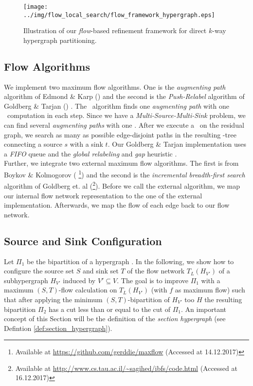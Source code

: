 \begin{figure}
\centering 
\texttt{[image: ../img/flow\_local\_search/flow\_framework\_hypergraph.eps]}
\caption{Illustration of our \emph{flow}-based refinement framework for direct $k$-way hypergraph
         partitioning.}
\label{img:flow_framework}
\end{figure} 

\subsection{Flow Algorithms}
\label{sec:flow_algo_implementation}

We implement two maximum flow algorithms.
One is the \emph{augmenting path} algorithm of Edmond \& Karp (\EdmondKarp)
\cite{edmonds1972theoretical} 
and the second is the \emph{Push-Relabel} algorithm of
Goldberg \& Tarjan (\GoldbergTarjan) \cite{cherkassky1997implementing,goldberg1988new}. 
The \EdmondKarp~algorithm finds one \emph{augmenting path} with one \BFS~computation in each step.
Since we have a \emph{Multi-Source-Multi-Sink} problem, we can find several \emph{augmenting paths}
with one \BFS. After we execute a \BFS~on the residual graph, we search 
as many as possible edge-disjoint paths in the resulting \BFS-tree connecting a source $s$
with a sink $t$. Our Goldberg \& Tarjan implementation uses a \emph{FIFO} queue and
the \emph{global relabeling} and \emph{gap} heuristic \cite{cherkassky1997implementing}. \\
Further, we integrate two external maximum flow algorithms. The first is from 
Boykov \& Kolmogorov \cite{boykov2004experimental} (\BoykovKolmogorov
\footnote{Available at \url{https://github.com/gerddie/maxflow} (Accessed at 14.12.2017)})
and the second is the \emph{incremental breadth-first search} algorithm of Goldberg et. al \cite{goldberg2015faster}
(\IBFS \footnote{Available at \url{http://www.cs.tau.ac.il/~sagihed/ibfs/code.html} (Accessed at 16.12.2017)}).
Before we call the external algorithm, we map our internal flow network representation to
the one of the external implementation. Afterwards, we map the flow of each edge back
to our flow network.


\subsection{Source and Sink Configuration}
\label{sec:source_and_sink}

Let $\Pi_1$ be the bipartition of a hypergraph \HypergraphDef.
In the following, we show how to configure the source set $S$ and sink set $T$ of the flow
network $T_L(H_{V'})$ of a subhypergraph $H_{V'}$ induced by $V' \subseteq V$. The goal is 
to improve $\Pi_1$ with a maximum $(S,T)$-flow calculation 
on $T_L(H_{V'})$ (with $f$ as maximum flow) such that after applying the minimum 
$(S,T)$-bipartition of $H_{V'}$ too $H$ the resulting bipartition $\Pi_2$ has a 
cut less than or equal to the cut of $\Pi_1$. An important concept of this Section will
be the definition of the \emph{section hypergraph} (see Defintion
\ref{def:section_hypergraph}). 

